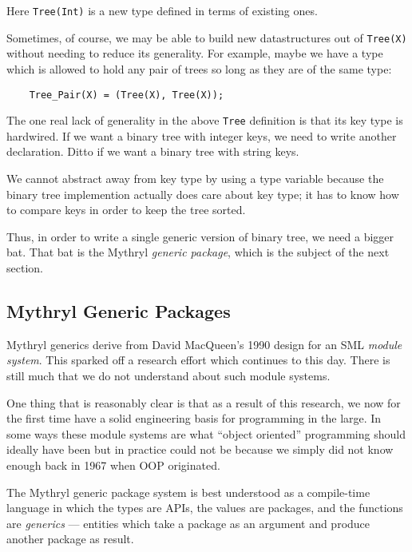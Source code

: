 Here {\tt Tree(Int)} is a new type defined in terms of existing ones.

Sometimes, of course, we may be able to build new datastructures out 
of {\tt Tree(X)} without needing to reduce its generality.  For 
example, maybe we have a type which is allowed to hold any pair of 
trees so long as they are of the same type:

\begin{verbatim}
    Tree_Pair(X) = (Tree(X), Tree(X));
\end{verbatim}

The one real lack of generality in the above {\tt Tree} definition is that 
its key type is hardwired.  If we want a binary tree with integer keys, 
we need to write another declaration.  Ditto if we want  a binary tree with 
string keys.

We cannot abstract away from key type by using a type 
variable because the binary tree implemention actually does care about 
key type; it has to know how to compare keys in order to keep the 
tree sorted.

Thus, in order to write a single generic version of binary tree, we need 
a bigger bat.  That bat is the Mythryl {\it generic package}, which is the subject 
of the next section.


\cutend*

\subsection{Mythryl Generic Packages}

Mythryl generics derive from David MacQueen's 1990 design for an SML {\it module system}. 
This sparked off a research effort which continues to this day.  There is still 
much that we do not understand about such module systems.

One thing that is reasonably clear is that as a result of this 
research, we now for the first time have a solid engineering basis 
for programming in the large.  In some ways these module systems are 
what ``object oriented'' programming should ideally have been but in 
practice could not be because we simply did not know enough back 
in 1967 when OOP originated.

The Mythryl generic package system is best understood as a compile-time 
language in which the types are {\sc API}s, the values are 
packages, and the functions are {\it generics} --- entities which 
take a package as an argument and produce another package as 
result.

